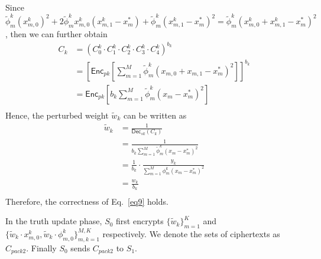 \documentclass[conference]{IEEEtran}
\begin{document}
Since $\tilde{\phi}_m^k (x_{m,0}^k)^2 + 2\tilde{\phi}_m^kx_{m,0}^k\left(x_{m,1}^k - x_m^*\right) + \tilde{\phi}_m^k(x_{m,1}^k - x_m^*)^2 = \tilde{\phi}_m^k (x_{m,0}^k + x_{m,1}^k - x_m^*)^2$, then we can further obtain
\begin{equation}
  \begin{split}
  C_k & = \left(C_0^k \cdot C_1^k\cdot C_2^k \cdot C_3^k \cdot C_4^k\right)^{b_k} \\
   & = \left[\mathsf{Enc}_{pk}\left[\sum_{m=1}^M \tilde{\phi}_m^k (x_{m,0} + x_{m,1} - x_m^*)^2 \right]\right]^{b_k} \\
  & = \mathsf{Enc}_{pk}\left[b_k \sum_{m=1}^M \tilde{\phi}_m^k (x_m - x_m^*)^2 \right] \\
  \end{split}
\end{equation}
Hence, the perturbed weight $\tilde{w}_k$ can be written as
\begin{equation}
  \begin{split}
  \tilde{w}_k & = \frac{1}{\mathsf{Dec}_{sk}\left(C_k\right)} \\
  & = \frac{1}{b_k \sum_{m=1}^M \tilde{\phi}_m^k (x_m - x_m^*)^2} \\
  & = \frac{1}{b_k} \cdot \frac{y_k}{\sum_{m=1}^M \phi_m^k (x_m - x_m^*)^2} \\
  & = \frac{w_k}{b_k} \\
  \end{split}
\end{equation}
Therefore, the correctness of Eq.~\ref{eq9} holds.


In the truth update phase, $S_0$ first encrypts $\{\tilde{w}_k\}_{m=1}^K$ and $\{\tilde{w}_k\cdot x_{m,0}^k, \tilde{w}_k\cdot \phi_{m,0}^k\}_{m,k=1}^{M,K}$ respectively.
We denote the sets of ciphertexts as $C_{pack2}$.
Finally $S_0$ sends $C_{pack2}$ to $S_1$.
\end{document}
